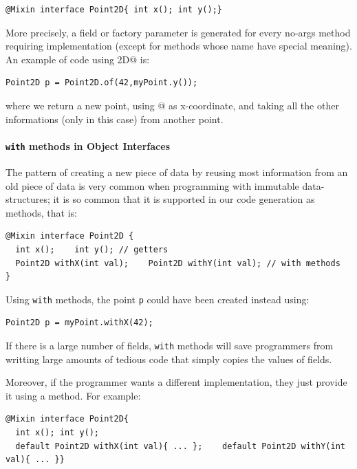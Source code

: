 \begin{lstlisting}
@Mixin interface Point2D{ int x(); int y();}
\end{lstlisting}

\noindent More precisely, a field or factory parameter is generated for every
no-args method requiring implementation (except for methods whose name have
special meaning).  An example of code using \Q@Point2D@ is:

\begin{lstlisting}
Point2D p = Point2D.of(42,myPoint.y());
\end{lstlisting}

\noindent where we return a new point, using @ as x-coordinate,
and taking all the other informations (only \Q@y@ in this case) from
another point.

\paragraph{\texttt{with} methods in Object Interfaces}
The pattern of creating a new piece of data by reusing most
information from an old piece of data is very common
when programming with immutable data-structures; it is so common that
it is supported in our code generation as \Q@with@ methods,
that is:
\begin{lstlisting}
@Mixin interface Point2D { 
  int x();    int y(); // getters
  Point2D withX(int val);    Point2D withY(int val); // with methods
}
\end{lstlisting}

\noindent Using \texttt{with} methods, the point \texttt{p} could have
been created instead using:

\begin{lstlisting}
Point2D p = myPoint.withX(42);
\end{lstlisting}

\noindent If there is a large number of fields, \texttt{with} methods
will save programmers from writting large amounts of tedious code that
simply copies the values of fields. 

Moreover, if the programmer wants a different implementation, they
just provide it using a \Q@default@ method. For example:
\begin{lstlisting}
@Mixin interface Point2D{ 
  int x(); int y();
  default Point2D withX(int val){ ... };    default Point2D withY(int val){ ... }}
\end{lstlisting}

